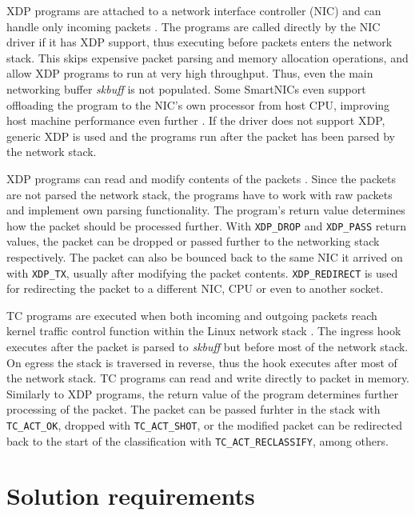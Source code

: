 \documentclass[english, 12pt, a4paper, sci, utf8, a-2b, online]{aaltothesis}
\begin{document}
XDP programs are attached to a network interface controller (NIC) and can handle only incoming packets \cite{hoiland2018express}. The programs are called directly by the NIC driver if it has XDP support, thus executing before packets enters the network stack. This skips expensive packet parsing and memory allocation operations, and allow XDP programs to run at very high throughput. Thus, even the main networking buffer \textit{skbuff} is not populated. Some SmartNICs even support offloading the program to the NIC's own processor from host CPU, improving host machine performance even further \cite{cilium-program-types}. If the driver does not support XDP, generic XDP is used and the programs run after the packet has been parsed by the network stack.

XDP programs can read and modify contents of the packets \cite{vieira2020fast}. Since the packets are not parsed the network stack, the programs have to work with raw packets and implement own parsing functionality. The program's return value determines how the packet should be processed further. With \texttt{XDP\_DROP} and \texttt{XDP\_PASS} return values, the packet can be dropped or passed further to the networking stack respectively. The packet can also be bounced back to the same NIC it arrived on with \texttt{XDP\_TX}, usually after modifying the packet contents. \texttt{XDP\_REDIRECT} is used for redirecting the packet to a different NIC, CPU or even to another socket.

TC programs are executed when both incoming and outgoing packets reach kernel traffic control function within the Linux network stack \cite{vieira2020fast}. The ingress hook executes after the packet is parsed to \textit{skbuff} but before most of the network stack. On egress the stack is traversed in reverse, thus the hook executes after most of the network stack. TC programs can read and write directly to packet in memory. Similarly to XDP programs, the return value of the program determines further processing of the packet. The packet can be passed furhter in the stack with \texttt{TC\_ACT\_OK}, dropped with \texttt{TC\_ACT\_SHOT}, or the modified packet can be redirected back to the start of the classification with \texttt{TC\_ACT\_RECLASSIFY}, among others.

\clearpage

\section{Solution requirements} \label{sec:methods}
\end{document}
